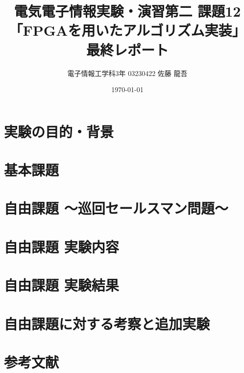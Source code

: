 \documentclass[dvipdfmx,10pt,a4paper,titlepage]{jsarticle}
\title{電気電子情報実験・演習第二 課題12\\「FPGAを用いたアルゴリズム実装」最終レポート}
\author{電子情報工学科3年 03230422 佐藤 龍吾}
\date{\today}
\begin{document}
\maketitle
\section{実験の目的・背景}

\section{基本課題}

\section{自由課題 ～巡回セールスマン問題～}

\section{自由課題 実験内容}

\section{自由課題 実験結果}

\section{自由課題に対する考察と追加実験}

\section{参考文献}

\end{document}
